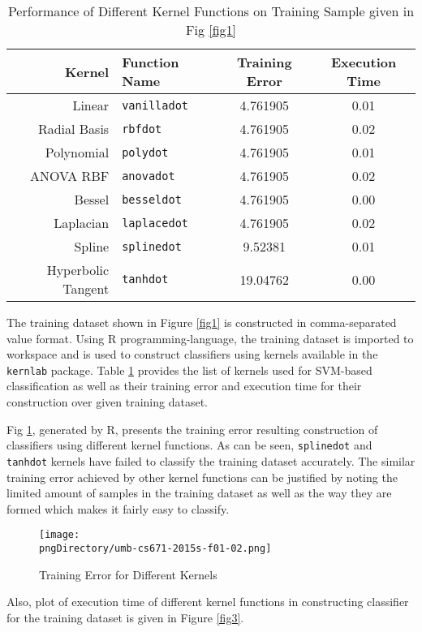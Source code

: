 \begin{table}[H]\centering
\begin{tabular}{r l c c}
Kernel & Function Name & Training Error & Execution Time\\
\hline
Linear & \texttt{vanilladot} & 4.761905 & 0.01\\
Radial Basis & \texttt{rbfdot} & 4.761905 & 0.02\\
Polynomial & \texttt{polydot} & 4.761905 & 0.01\\
ANOVA RBF & \texttt{anovadot} & 4.761905 & 0.02\\
Bessel & \texttt{besseldot} & 4.761905 & 0.00\\
Laplacian & \texttt{laplacedot} & 4.761905 & 0.02\\
Spline & \texttt{splinedot} & 9.52381 & 0.01\\
Hyperbolic Tangent & \texttt{tanhdot} & 19.04762 & 0.00\\
\hline
\end{tabular}
\caption{Performance of Different Kernel Functions on Training Sample given in Fig \ref{fig1}}\label{tab1}
\end{table}

The training dataset shown in Figure \ref{fig1} is constructed in comma-separated value format.
Using R programming-language, the training dataset is imported to workspace and is used to construct classifiers using kernels available in the \texttt{kernlab} package.
Table \ref{tab1} provides the list of kernels used for SVM-based classification as well as their training error and execution time for their construction over given training dataset.

Fig \ref{fig2}, generated by R, presents the training error resulting construction of  classifiers using different kernel functions.
As can be seen, \texttt{splinedot} and \texttt{tanhdot} kernels have failed to classify the training dataset accurately.
The similar training error achieved by other kernel functions can be justified by noting the limited amount of samples in the training dataset as well as the way they are formed  which makes it fairly easy to classify.

\begin{figure}\centering
\texttt{[image: \\pngDirectory/umb-cs671-2015s-f01-02.png]}
\caption{Training Error for Different Kernels}\label{fig2}
\end{figure}

Also, plot of execution time of different kernel functions in constructing classifier for the training dataset is given in Figure \ref{fig3}.

